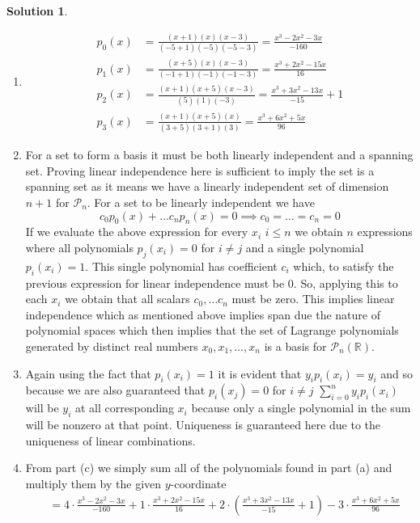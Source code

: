 \documentclass[10pt]{article}
\theoremstyle{definition}
\newtheorem{soln}{Solution}
\begin{document}
\begin{soln}~
  \begin{enumerate}[label=(\alph*)]
    \item \begin{align*}
            p_0(x) & =\frac{(x+1)(x)(x-3)}{(-5+1)(-5)(-5-3)}=\frac{x^3-2x^2-3x}{-160} \\
            p_1(x) & =\frac{(x+5)(x)(x-3)}{(-1+1)(-1)(-1-3)}=\frac{x^3+2x^2-15x}{16}  \\
            p_2(x) & =\frac{(x+1)(x+5)(x-3)}{(5)(1)(-3)}=\frac{x^3+3x^2-13x}{-15}+1   \\
            p_3(x) & =\frac{(x+1)(x+5)(x)}{(3+5)(3+1)(3)}=\frac{x^3+6x^2+5x}{96}
          \end{align*}
    \item For a set to form a basis it must be both linearly independent and a spanning set. Proving linear independence here is sufficient to
          imply the set is a spanning set as it means we have a linearly independent set of dimension $n+1$ for $\mathcal{P}_n$. For a set to be linearly independent
          we have
          $$c_0p_0(x)+\dots c_np_n(x)=0\implies c_0=\dots=c_n=0$$
          If we evaluate the above expression for every $x_i$ $i\leq n$ we obtain $n$ expressions where all polynomials $p_j(x_i)=0$ for $i\neq j$ and a single polynomial
          $p_i(x_i)=1$. This single polynomial has coefficient $c_i$ which, to satisfy the previous expression for linear independence must be 0. So,
          applying this to each $x_i$ we obtain that all scalars $c_0,\dots c_n$ must be zero. This implies linear independence which as mentioned above implies
          span due the nature of polynomial spaces which then implies that the set of Lagrange polynomials generated by distinct real numbers $x_0,x_1,\dots,x_n$ is
          a basis for $\mathcal{P}_n(\mathbb{R})$.
    \item Again using the fact that $p_i(x_i)=1$ it is evident that $y_ip_i(x_i)=y_i$ and so because we
          are also guaranteed that $p_i(x_j)=0$ for $i\neq j$ $\sum_{i=0}^{n}y_ip_i(x_i)$ will be $y_i$ at all corresponding $x_i$ because only a single polynomial
          in the sum will be nonzero at that point. Uniqueness is guaranteed here due to the uniqueness of linear combinations.
    \item From part (c) we simply sum all of the polynomials found in part (a) and multiply them by the given $y$-coordinate
          \begin{align*}
             & =4\cdot\frac{x^3-2x^2-3x}{-160}+1\cdot\frac{x^3+2x^2-15x}{16}+2\cdot\left(\frac{x^3+3x^2-13x}{-15}+1\right)-3\cdot\frac{x^3+6x^2+5x}{96} \\

\end{align*}
\end{enumerate}
\end{soln}
\end{document}
